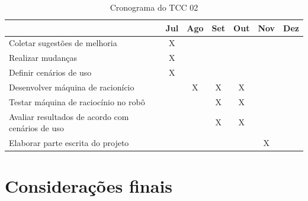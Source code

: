 \FloatBarrier
\begin{table}[h]
	\centering
	
	\begin{tabular}{lcccccc}
		\toprule
		& \textbf{Jul} & \textbf{Ago} & \textbf{Set} & \textbf{Out} & \textbf{Nov} & 		
		\textbf{Dez} \\
		\midrule
		Coletar sugestões de melhoria & X &  &  &  &  &  \\
		\midrule
		Realizar mudanças & X &  &  &  &  &  \\
		\midrule
		Definir cenários de uso & X &  &  &  &  &  \\
		\midrule
		Desenvolver máquina de racionício &  & X & X & X &  &  \\
		\midrule
		Testar máquina de raciocínio no robô &  &  & X & X &  &  \\
		\midrule
		Avaliar resultados de acordo com cenários de uso &  &  & X & X &  &  \\
		\midrule
		Elaborar parte escrita do projeto &  &  &  &  & X &  \\
		\bottomrule
	\end{tabular}

	\caption{Cronograma do TCC 02}
	\label{tab02}
\end{table}
\section{Considerações finais}
